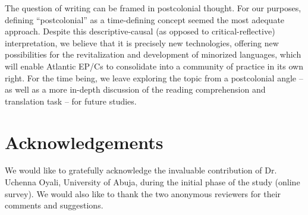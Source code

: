 \documentclass[output=paper,colorlinks,citecolor=brown]{langscibook}
\begin{document}
The question of writing can be framed in postcolonial thought. For our purposes, defining “postcolonial” as a time-defining concept seemed the most adequate approach. Despite this descriptive-causal (as opposed to critical-reflective) interpretation, we believe that it is precisely new technologies, offering new possibilities for the revitalization and development of minorized languages, which will enable Atlantic EP/Cs to consolidate into a community of practice in its own right. For the time being, we leave exploring the topic from a postcolonial angle – as well as a more in-depth discussion of the reading comprehension and translation task – for future studies.


\section*{Acknowledgements}
We would like to gratefully acknowledge the invaluable contribution of Dr. Uchenna Oyali, University of Abuja, during the initial phase of the study (online survey). We would also like to thank the two anonymous reviewers for their comments and suggestions.

\printbibliography[heading=subbibliography,notkeyword=this]
\end{document}

